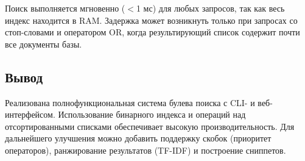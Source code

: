 \documentclass[12pt,a4paper]{article}
\begin{document}
Поиск выполняется мгновенно ($<$1 мс) для любых запросов, так как весь индекс находится в RAM. Задержка может возникнуть только при запросах со стоп-словами и оператором OR, когда результирующий список содержит почти все документы базы.

\subsection{Вывод}

Реализована полнофункциональная система булева поиска с CLI- и веб-интерфейсом. Использование бинарного индекса и операций над отсортированными списками обеспечивает высокую производительность. Для дальнейшего улучшения можно добавить поддержку скобок (приоритет операторов), ранжирование результатов (TF-IDF) и построение сниппетов.
\end{document}
